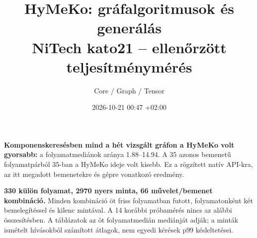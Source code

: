 \documentclass[10pt,a4paper]{article}
\title{HyMeKo: gráfalgoritmusok és generálás\\NiTech kato21 -- ellenőrzött teljesítménymérés}
\author{Core / Graph / Tensor}\date{2026-10-21 00:47 +02:00}
\begin{document}
\maketitle
\textbf{Komponenskeresésben mind a hét vizsgált gráfon a HyMeKo volt gyorsabb:}
a folyamatmediánok aránya 1.88--14.94. A 35 azonos bemenetű folyamatpárból
35-ban a HyMeKo ideje volt kisebb. Ez a rögzített natív API-kra, az itt megadott
bemenetekre és gépre vonatkozó eredmény.

\textbf{330 külön folyamat, 2970 nyers minta, 66 művelet/bemenet kombináció.}
Minden kombináció öt friss folyamatban futott, folyamatonként két bemelegítéssel
és kilenc mintával. A 14 korábbi próbamérés nincs az alábbi összesítésben.
A táblázatok az öt folyamatmedián mediánját adják; a minták ismételt hívásokból
számított átlagok, nem egyedi kérések p99 késleltetései.
\end{document}

